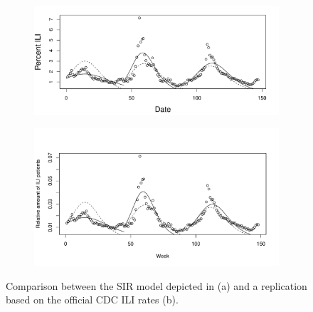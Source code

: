 \documentclass[11pt, a4paper,twoside]{report}\usepackage[]{graphicx}\usepackage[]{color}
\begin{document}
\begin{figure}[H]
\centering
  \begin{subfigure}[t]{1\textwidth}
  \includegraphics[width=1\linewidth]{02_todd_bodnar_SIR.png}
  \caption{}
  \end{subfigure}
  
  \begin{subfigure}[t]{1\textwidth}
  \includegraphics[width=1\linewidth]{38_SIR_model_cdc_data_25.pdf}
  \caption{}
  \label{fig:SIR_comparison_CDC}
  \end{subfigure}
  \caption{Comparison between the SIR model depicted in \cite{bodnar_data_2015} (a) and a replication based on the official CDC ILI rates (b).}
\end{figure}
\end{document}
